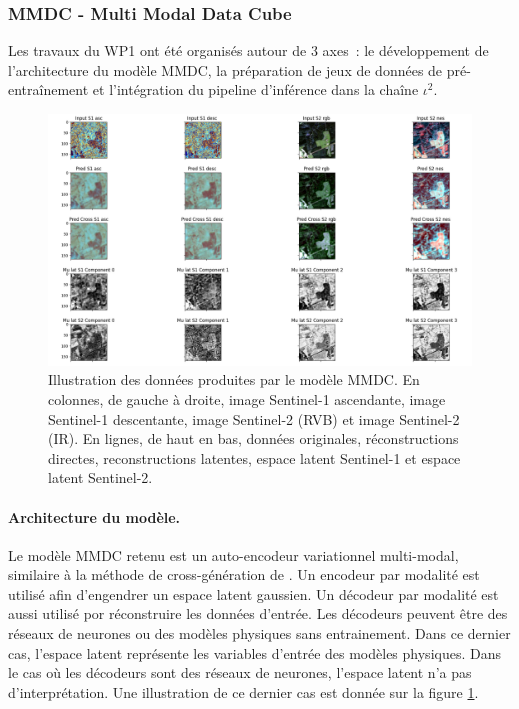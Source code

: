 \subsubsection{MMDC - Multi Modal Data Cube}
Les travaux du WP1 ont été organisés autour de 3 axes : le développement de l’architecture du modèle MMDC, la préparation de jeux de données de pré-entraînement et l’intégration du pipeline d’inférence dans la chaîne $\iota^2$.
\begin{figure}[htbp]
\begin{center}
\includegraphics[width=\columnwidth]{img/wp1/mmdc5.png}
\caption{Illustration des données produites par le modèle MMDC. En colonnes, de gauche à droite, image Sentinel-1 ascendante, image Sentinel-1 descentante, image Sentinel-2 (RVB) et image Sentinel-2 (IR). En lignes, de haut en bas, données originales, réconstructions directes, reconstructions latentes, espace latent Sentinel-1 et espace latent Sentinel-2.}
\label{fig:mmdcresults}
\end{center}
\end{figure}

\paragraph{Architecture du modèle.}
Le modèle MMDC retenu est un auto-encodeur variationnel multi-modal, similaire à la méthode de cross-génération de \cite{shi-2019-variat-mixtur}. Un encodeur par modalité est utilisé afin d’engendrer un espace latent gaussien. Un décodeur par modalité est aussi utilisé por réconstruire les données d’entrée. Les décodeurs peuvent être des réseaux de neurones ou des modèles physiques sans entrainement. Dans ce dernier cas, l’espace latent représente les variables d’entrée des modèles physiques. Dans le cas où les décodeurs sont des réseaux de neurones, l’espace latent n’a pas d’interprétation. Une illustration de ce dernier cas est donnée sur la figure \ref{fig:mmdcresults}.

